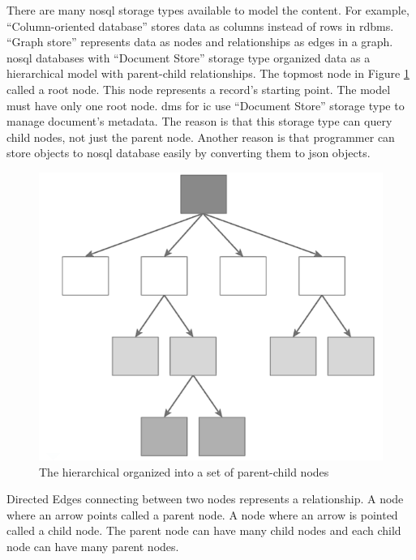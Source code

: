 There are many \gls{nosql} storage types available to model the content.
For example, \enquote{Column-oriented database} stores data as columns instead of rows in \gls{rdbms}.
\enquote{Graph store} represents data as nodes and relationships as edges in a graph.
\gls{nosql} databases with \enquote{Document Store} storage type organized data as a hierarchical model with parent-child relationships.
The topmost node in Figure \ref{arch-node} called a root node.
This node represents a record's starting point.
The model must have only one root node.
\gls{dms} for \gls{ic} use \enquote{Document Store} storage type to manage document's metadata.
The reason is that this storage type can query child nodes, not just the parent node.
Another reason is that programmer can store objects to \gls{nosql} database easily by converting them to \gls{json} objects.
\begin{figure}[h]
	\centering
	\includegraphics[scale=0.48]{res/bg-knowledge/nosql-hierarchical}
	\caption{The hierarchical organized into a set of parent-child nodes }
	\label{arch-node}
\end{figure}
Directed Edges connecting between two nodes represents a relationship.
A node where an arrow points called a parent node.
A node where an arrow is pointed called a child node.
The parent node can have many child nodes and each child node can have many parent nodes.


